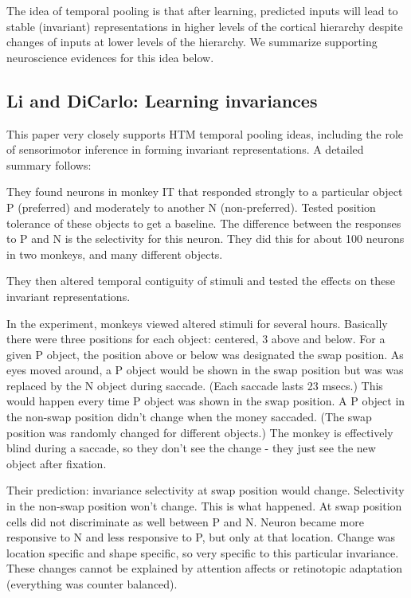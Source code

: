 \documentclass{article} %
\begin{document}
The idea of temporal pooling is that after learning, predicted inputs will
lead to stable (invariant) representations in higher levels of the cortical
hierarchy despite changes of inputs at lower levels of the hierarchy. We
summarize supporting neuroscience evidences for this idea below.

\subsection{Li and DiCarlo: Learning invariances}

This paper \cite{Li2008} very closely supports HTM temporal pooling ideas,
including the role of sensorimotor inference in forming invariant
representations.  A detailed summary follows:

They found neurons in monkey IT that responded strongly to a particular object
P (preferred) and moderately to another N (non-preferred). Tested position
tolerance of these objects to get a baseline.  The difference between the
responses to P and N is the selectivity for this neuron.  They did this
for about 100 neurons in two monkeys, and many different objects.

They then altered temporal contiguity of stimuli and tested the effects on these
invariant representations.



In the experiment, monkeys viewed altered stimuli for several hours. Basically
there were three positions for each object: centered, 3 above and below. For a
given P object, the position above or below was designated the swap position.
As eyes moved around, a P object would be shown in the swap position but was was
replaced by the N object during saccade. (Each saccade lasts 23 msecs.) This
would happen every time P object was shown in the swap position.  A P object in
the non-swap position didn't change when the money saccaded. (The swap position
was randomly changed for different objects.)  The monkey is effectively blind
during a saccade, so they don't see the change - they just see the new object
after fixation.

Their prediction: invariance selectivity at swap position would change.
Selectivity in the non-swap position won't change.  This is what happened. At
swap position cells did not discriminate as well between P and N. Neuron became
more responsive to N and less responsive to P, but only at that location. Change
was location specific and shape specific, so very specific to this particular
invariance. These changes cannot be explained by attention affects or
retinotopic adaptation (everything was counter balanced).
\end{document}
